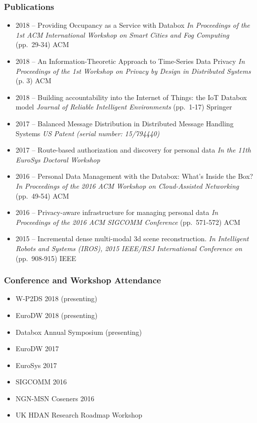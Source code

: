 \documentclass[aspectratio=169]{beamer}
\begin{document}
\begin{frame}
	\frametitle{Publications}
	\footnotesize
	\begin{itemize}
		\item 2018 -- Providing Occupancy as a Service with Databox \textit{In Proceedings of the 1st ACM International Workshop on Smart Cities and Fog Computing} (pp.\ 29-34) ACM
		\item 2018 -- An Information-Theoretic Approach to Time-Series Data Privacy \textit{In Proceedings of the 1st Workshop on Privacy by Design in Distributed Systems} (p. 3) ACM
		\item 2018 -- Building accountability into the Internet of Things: the IoT Databox model \textit{Journal of Reliable Intelligent Environments} (pp.\ 1-17) Springer
		\item 2017 -- Balanced Message Distribution in Distributed Message Handling Systems \textit{US Patent (serial number: 15/794440)}
		\item 2017 -- Route-based authorization and discovery for personal data \textit{In the 11th EuroSys Doctoral Workshop}
		\item 2016 -- Personal Data Management with the Databox: What's Inside the Box? \textit{In Proceedings of the 2016 ACM Workshop on Cloud-Assisted Networking} (pp.\ 49-54) ACM
		\item 2016 -- Privacy-aware infrastructure for managing personal data \textit{In Proceedings of the 2016 ACM SIGCOMM Conference} (pp.\ 571-572) ACM
		\item 2015 -- Incremental dense multi-modal 3d scene reconstruction. \textit{In Intelligent Robots and Systems (IROS), 2015 IEEE/RSJ International Conference on} (pp.\ 908-915) IEEE
	\end{itemize}
\end{frame}

\begin{frame}
	\frametitle{Conference and Workshop Attendance}
	\begin{itemize}
		\item W-P2DS 2018 (presenting)
		\item EuroDW 2018 (presenting)
		\item Databox Annual Symposium (presenting)
		\item EuroDW 2017
		\item EuroSys 2017
		\item SIGCOMM 2016
		\item NGN-MSN Coseners 2016
		\item UK HDAN Research Roadmap Workshop
	\end{itemize}
\end{frame}
\end{document}
